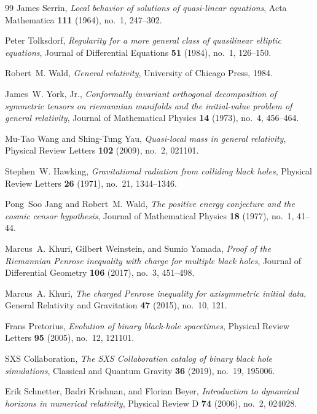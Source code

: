 \begin{thebibliography}{99}
James Serrin, \emph{Local behavior of solutions of quasi-linear equations},
  Acta Mathematica \textbf{111} (1964), no.~1, 247--302.

Peter Tolksdorf, \emph{Regularity for a more general class of quasilinear
  elliptic equations}, Journal of Differential Equations \textbf{51} (1984),
  no.~1, 126--150.

Robert~M. Wald, \emph{General relativity}, University of Chicago Press, 1984.

James~W. York, Jr., \emph{Conformally invariant orthogonal decomposition of
  symmetric tensors on riemannian manifolds and the initial-value problem of
  general relativity}, Journal of Mathematical Physics \textbf{14} (1973),
  no.~4, 456--464.

Mu-Tao Wang and Shing-Tung Yau, \emph{Quasi-local mass in general relativity}, Physical Review Letters \textbf{102} (2009), no.~2, 021101.

Stephen~W. Hawking, \emph{Gravitational radiation from colliding black holes}, Physical Review Letters \textbf{26} (1971), no.~21, 1344--1346.

Pong~Soo Jang and Robert~M. Wald, \emph{The positive energy conjecture and the cosmic censor hypothesis}, Journal of Mathematical Physics \textbf{18} (1977), no.~1, 41--44.

Marcus~A. Khuri, Gilbert Weinstein, and Sumio Yamada, \emph{Proof of the Riemannian Penrose inequality with charge for multiple black holes}, Journal of Differential Geometry \textbf{106} (2017), no.~3, 451--498.

Marcus~A. Khuri, \emph{The charged Penrose inequality for axisymmetric initial data}, General Relativity and Gravitation \textbf{47} (2015), no.~10, 121.

Frans Pretorius, \emph{Evolution of binary black-hole spacetimes}, Physical Review Letters \textbf{95} (2005), no.~12, 121101.

SXS Collaboration, \emph{The SXS Collaboration catalog of binary black hole simulations}, Classical and Quantum Gravity \textbf{36} (2019), no.~19, 195006.

Erik Schnetter, Badri Krishnan, and Florian Beyer, \emph{Introduction to dynamical horizons in numerical relativity}, Physical Review D \textbf{74} (2006), no.~2, 024028.


\end{thebibliography}
